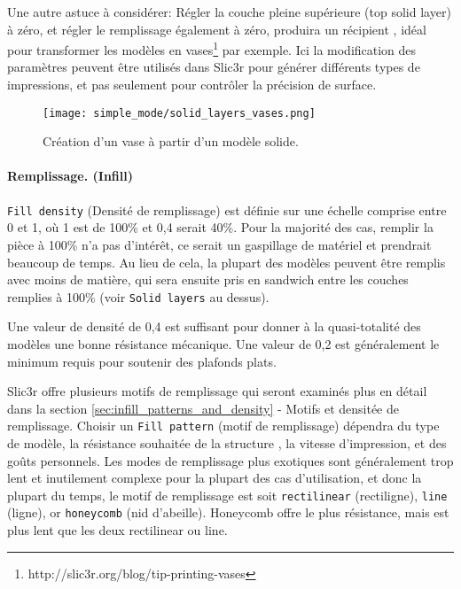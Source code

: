 Une autre astuce à considérer: Régler la couche pleine supérieure (top solid layer) à zéro, et régler le remplissage également à zéro, produira un récipient , idéal pour transformer les modèles en vases\footnote{http://slic3r.org/blog/tip-printing-vases} par exemple. Ici la modification des paramètres peuvent être utilisés dans Slic3r pour générer différents types de impressions, et pas seulement pour contrôler la précision de surface.

\begin{figure}[H]
\centering
\texttt{[image: simple\_mode/solid\_layers\_vases.png]}
\caption{Création d'un vase à partir d'un modèle solide.}
\label{fig:solid_layers_vases}
\end{figure}


\paragraph{Remplissage. (Infill)} %
\label{par:simple_infill}
\texttt{Fill density} (Densité de remplissage) est définie sur une échelle comprise entre 0 et 1, où 1 est de 100\% et 0,4 serait 40\%. Pour la majorité des cas, remplir la pièce à 100\% n'a pas d'intérêt, ce serait un gaspillage de matériel et prendrait beaucoup de temps. Au lieu de cela, la plupart des modèles peuvent être remplis avec moins de matière, qui sera ensuite pris en sandwich entre les couches remplies à 100\% (voir \texttt{Solid layers} au dessus).

Une valeur de densité de 0,4 est suffisant pour donner à la quasi-totalité des modèles une bonne résistance mécanique. Une valeur de 0,2 est généralement le minimum requis pour soutenir des plafonds plats.

Slic3r offre plusieurs motifs de remplissage qui seront examinés plus en détail dans la section \ref{sec:infill_patterns_and_density} - Motifs et densitée de remplissage.  Choisir un \texttt{Fill pattern} (motif de remplissage) dépendra du type de modèle, la résistance souhaitée de la structure , la vitesse d'impression, et des goûts personnels. Les modes de remplissage plus exotiques sont généralement trop lent et inutilement complexe pour la plupart des cas d'utilisation, et donc la plupart du temps, le motif de remplissage est soit \texttt{rectilinear} (rectiligne), \texttt{line} (ligne), or \texttt{honeycomb} (nid d'abeille).  Honeycomb offre le plus résistance, mais est plus lent que les deux rectilinear ou line.

